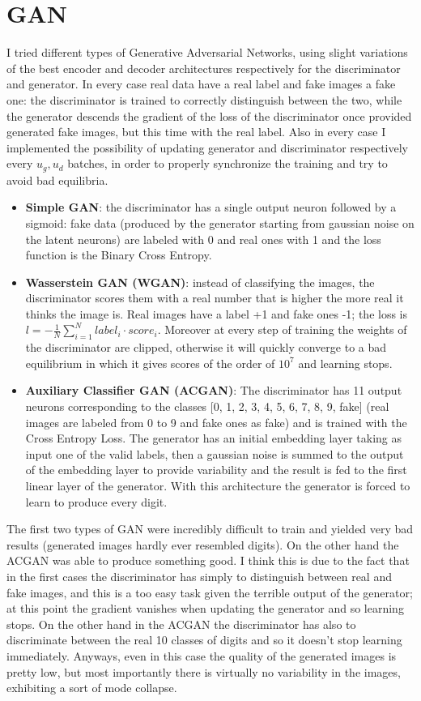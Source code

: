 \documentclass[a4paper, 11pt]{article}
\begin{document}
\section{GAN}
  I tried different types of Generative Adversarial Networks, using slight variations of the best encoder and decoder architectures respectively for the discriminator and generator. In every case real data have a real label and fake images a fake one: the discriminator is trained to correctly distinguish between the two, while the generator descends the gradient of the loss of the discriminator once provided generated fake images, but this time with the real label. Also in every case I implemented the possibility of updating generator and discriminator respectively every $u_g, u_d$ batches, in order to properly synchronize the training and try to avoid bad equilibria.
  \begin{itemize}
    \item \textbf{Simple GAN}: the discriminator has a single output neuron followed by a sigmoid: fake data (produced by the generator starting from gaussian noise on the latent neurons) are labeled with 0 and real ones with 1 and the loss function is the Binary Cross Entropy.
    \item \textbf{Wasserstein GAN (WGAN)}: instead of classifying the images, the discriminator scores them with a real number that is higher the more real it thinks the image is. Real images have a label +1 and fake ones -1; the loss is $l = -\frac{1}{N}\sum_{i=1}^N label_i\cdot score_i$. Moreover at every step of training the weights of the discriminator are clipped, otherwise it will quickly converge to a bad equilibrium in which it gives scores of the order of $10^7$ and learning stops.
    \item \textbf{Auxiliary Classifier GAN (ACGAN)}: The discriminator has 11 output neurons corresponding to the classes [0, 1, 2, 3, 4, 5, 6, 7, 8, 9, fake] (real images are labeled from 0 to 9 and fake ones as fake) and is trained with the Cross Entropy Loss. The generator has an initial embedding layer taking as input one of the valid labels, then a gaussian noise is summed to the output of the embedding layer to provide variability and the result is fed to the first linear layer of the generator. With this architecture the generator is forced to learn to produce every digit.
  \end{itemize}

  The first two types of GAN were incredibly difficult to train and yielded very bad results (generated images hardly ever resembled digits). On the other hand the ACGAN was able to produce something good. I think this is due to the fact that in the first cases the discriminator has simply to distinguish between real and fake images, and this is a too easy task given the terrible output of the generator; at this point the gradient vanishes when updating the generator and so learning stops. On the other hand in the ACGAN the discriminator has also to discriminate between the real 10 classes of digits and so it doesn't stop learning immediately. Anyways, even in this case the quality of the generated images is pretty low, but most importantly there is virtually no variability in the images, exhibiting a sort of mode collapse.
\end{document}

